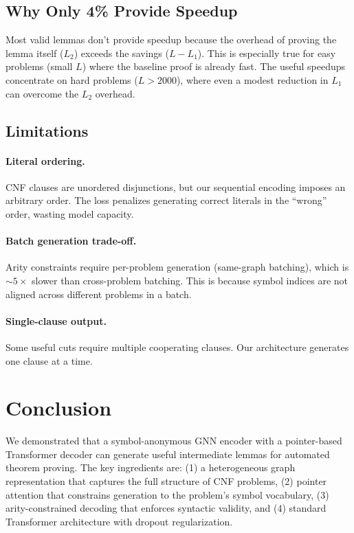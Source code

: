 \documentclass{article}
\begin{document}
\subsection{Why Only 4\% Provide Speedup}

Most valid lemmas don't provide speedup because the overhead of proving the
lemma itself ($L_2$) exceeds the savings ($L - L_1$). This is especially true
for easy problems (small $L$) where the baseline proof is already fast.
The useful speedups concentrate on hard problems ($L > 2000$), where even
a modest reduction in $L_1$ can overcome the $L_2$ overhead.

\subsection{Limitations}

\paragraph{Literal ordering.} CNF clauses are unordered disjunctions, but our
sequential encoding imposes an arbitrary order. The loss penalizes generating
correct literals in the ``wrong'' order, wasting model capacity.

\paragraph{Batch generation trade-off.} Arity constraints require per-problem
generation (same-graph batching), which is ${\sim}5\times$ slower than
cross-problem batching. This is because symbol indices are not aligned across
different problems in a batch.

\paragraph{Single-clause output.} Some useful cuts require multiple cooperating
clauses. Our architecture generates one clause at a time.

\section{Conclusion}
\label{sec:conclusion}

We demonstrated that a symbol-anonymous GNN encoder with a pointer-based
Transformer decoder can generate useful intermediate lemmas for automated
theorem proving. The key ingredients are: (1) a heterogeneous graph representation
that captures the full structure of CNF problems, (2) pointer attention that
constrains generation to the problem's symbol vocabulary, (3) arity-constrained
decoding that enforces syntactic validity, and (4) standard Transformer
architecture with dropout regularization.
\end{document}
